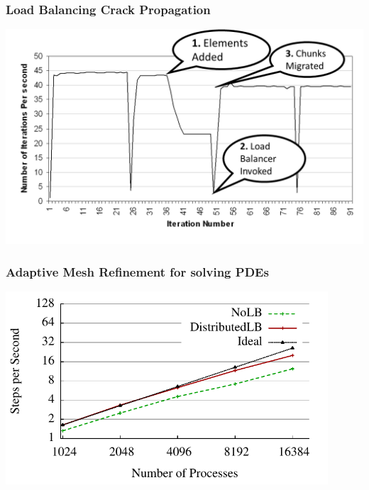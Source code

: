 \begin{frame}[fragile]
\frametitle{Load Balancing Crack Propagation}
\begin{centering}
\includegraphics[width=1.0\textwidth]{../figures/LButilizationCrackPropWithAnnotation}
\end{centering}
\end{frame}


\begin{frame}
\frametitle{Adaptive Mesh Refinement for solving PDEs}
\includegraphics[width=0.9\textwidth]{../figures/amr_scaling_distlb.pdf}
\end{frame}




